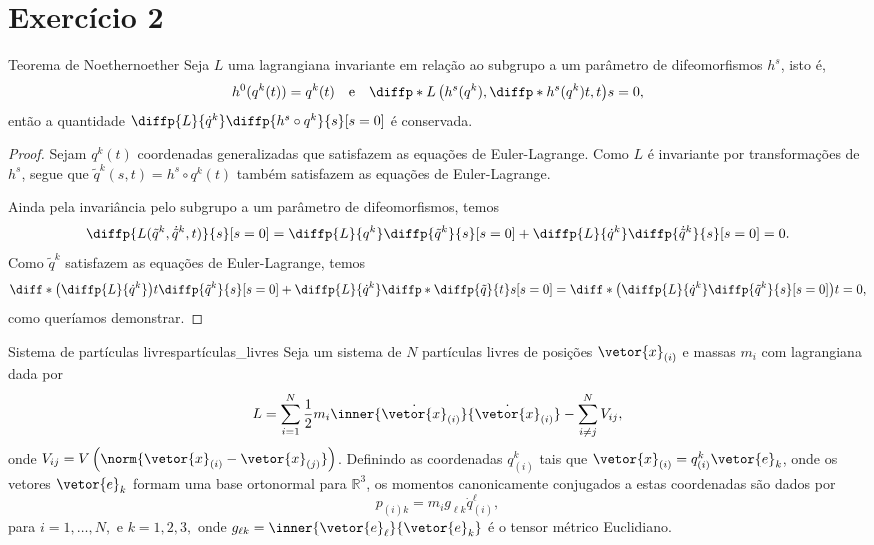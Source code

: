 \section*{Exercício 2}
\begin{theorem}{Teorema de Noether}{noether}
    Seja \(L\) uma lagrangiana invariante em relação ao subgrupo a um parâmetro de difeomorfismos \(h^s\), isto é,
    \begin{equation*}
        h^0(q^k(t)) = q^k(t)\quad\text{e}\quad \diffp*{L\left(h^s(q^k), \diffp*{h^s(q^k)}{t}, t\right)}{s} = 0,
    \end{equation*}
    então a quantidade \(\diffp{L}{\dot{q}^k}\diffp{h^s\circ q^k}{s}[s=0]\) é conservada.
\end{theorem}
\begin{proof}
    Sejam \(q^k(t)\) coordenadas generalizadas que satisfazem as equações de Euler-Lagrange. Como \(L\) é invariante por transformações de \(h^s\), segue que \(\tilde{q}^k(s,t) = h^s\circ q^k(t)\) também satisfazem as equações de Euler-Lagrange.

    Ainda pela invariância pelo subgrupo a um parâmetro de difeomorfismos, temos
    \begin{equation*}
        \diffp{L(\tilde{q}^k, \dot{\tilde{q}}^k, t)}{s}[s=0] = \diffp{L}{q^k}\diffp{\tilde{q}^k}{s}[s=0] + \diffp{L}{\dot{q}^k}\diffp{\dot{\tilde{q}}^k}{s}[s=0] = 0.
    \end{equation*}
    Como \(\tilde{q}^k\) satisfazem as equações de Euler-Lagrange, temos
    \begin{equation*}
        \diff*{\left(\diffp{L}{\dot{q}^k}\right)}{t}\diffp{\tilde{q}^k}{s}[s=0] + \diffp{L}{\dot{q}^k}\diffp*{\diffp{\tilde{q}}{t}}{s}[s=0] = \diff*{\left(\diffp{L}{\dot{q}^k}\diffp{\tilde{q}^k}{s}[s=0]\right)}{t} = 0,
    \end{equation*}
    como queríamos demonstrar.
\end{proof}
\begin{lemma}{Sistema de partículas livres}{partículas_livres}
    Seja um sistema de \(N\) partículas livres de posições \(\vetor{x}_{(i)}\) e massas \(m_i\) com lagrangiana dada por
    \begin{equation*}
        L = \sum_{i = 1}^N \frac12m_i \inner{\dot{\vetor{x}}_{(i)}}{\dot{\vetor{x}}_{(i)}} - \sum_{i\neq j}^N V_{ij},
    \end{equation*}
    onde \(V_{ij} = V\left(\norm{\vetor{x}_{(i)} - \vetor{x}_{(j)}}\right)\). Definindo as coordenadas \(q_{(i)}^k\) tais que \(\vetor{x}_{(i)} = q_{(i)}^k\vetor{e}_k\), onde os vetores \(\vetor{e}_k\) formam uma base ortonormal para \(\mathbb{R}^3\), os momentos canonicamente conjugados a estas coordenadas são dados por
    \begin{equation*}
        {p}_{(i)k} = m_i g_{\ell k}\dot{q}_{(i)}^\ell,
    \end{equation*}
    para \(i = 1, \dots, N,\) e \(k = 1,2,3,\) onde \(g_{\ell k} = \inner{\vetor{e}_{\ell}}{\vetor{e}_k}\) é o tensor métrico Euclidiano.
\end{lemma}
